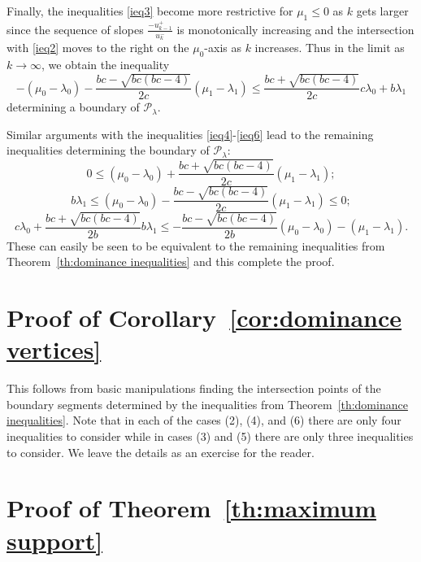 \documentclass{amsart}
\numberwithin{theorem}{section}
\newcommand{\cP}{\mathcal{P}}
\begin{document}
  Finally, the inequalities \eqref{ieq3} become more restrictive for $\mu_1\le0$ as $k$ gets larger since the sequence of slopes $\frac{-u_{k-1}^+}{u_k^-}$ is monotonically increasing and the intersection with \eqref{ieq2} moves to the right on the $\mu_0$-axis as $k$ increases.
  Thus in the limit as $k\to\infty$, we obtain the inequality
  \[ -(\mu_0-\lambda_0)-\frac{bc-\sqrt{bc(bc-4)}}{2c}(\mu_1-\lambda_1) \le \frac{bc+\sqrt{bc(bc-4)}}{2c}c\lambda_0+b\lambda_1 \]
  determining a boundary of $\cP_\lambda$.

  Similar arguments with the inequalities \eqref{ieq4}-\eqref{ieq6} lead to the remaining inequalities determining the boundary of $\cP_\lambda$:
  \[ 0 \le (\mu_0-\lambda_0)+\frac{bc+\sqrt{bc(bc-4)}}{2c}(\mu_1-\lambda_1);\]
  \[ b\lambda_1 \le (\mu_0-\lambda_0)-\frac{bc-\sqrt{bc(bc-4)}}{2c}(\mu_1-\lambda_1) \le 0;\]
  \[ c\lambda_0+\frac{bc+\sqrt{bc(bc-4)}}{2b}b\lambda_1 \le -\frac{bc-\sqrt{bc(bc-4)}}{2b}(\mu_0-\lambda_0)-(\mu_1-\lambda_1).\]
  These can easily be seen to be equivalent to the remaining inequalities from Theorem~\ref{th:dominance inequalities} and this complete the proof.


\section{Proof of Corollary~\ref{cor:dominance vertices}}
\label{sec:dominance vertices}

  This follows from basic manipulations finding the intersection points of the boundary segments determined by the inequalities from Theorem~\ref{th:dominance inequalities}.
  Note that in each of the cases (2), (4), and (6) there are only four inequalities to consider while in cases (3) and (5) there are only three inequalities to consider.
  We leave the details as an exercise for the reader.


\section{Proof of Theorem~\ref{th:maximum support}}
\label{sec:maximum support}
\end{document}
